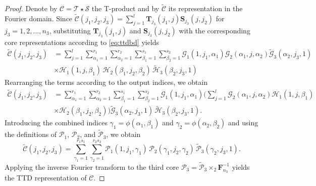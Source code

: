\documentclass[onefignum,onetabnum]{siamart250211}
\begin{document}
\begin{proof}
    Denote by $\mathscr{C}=\mathscr{T}\star\mathscr{S}$  the T-product and by $\widetilde{\mathscr{C}}$  its representation in the Fourier domain. Since $\widetilde{\mathscr{C}}(j_1,j_2,j_3) = \sum_{j=1}^{l}\textbf{T}_{j_3}(j_1,j)\textbf{S}_{j_3}(j,j_2)$ for $j_3=1,2,\dots, n_3$, substituting $\textbf{T}_{j_3}(j_1,j)$ and $\textbf{S}_{j_3}(j,j_2)$ with the corresponding core representations according to \eqref{eq:ttdbd} yields
    \begin{align*}
\widetilde{\mathscr{C}}(j_1,j_2,j_3)&= 
\sum_{j=1}^{l}
\sum_{\alpha_1=1}^{r_1}
\sum_{\alpha_2=1}^{r_2}
\sum_{\beta_1=1}^{s_1}
\sum_{\beta_2=1}^{s_2}
\mathscr{G}_1(1,j_1,\alpha_1)
\mathscr{G}_2(\alpha_1,j,\alpha_2)
\widetilde{\mathscr{G}}_3(\alpha_2,j_3,1)\\
& \times\mathscr{H}_1(1,j,\beta_1)\, \mathscr{H}_2(\beta_1,j_2,\beta_2)\, \widetilde{\mathscr{H}}_3(\beta_2,j_3,1) 
    \end{align*}
Rearranging the terms according to the output indices, we obtain 
\begin{align*}
\widetilde{\mathscr{C}}(j_1,j_2,j_3)
&= 
\sum_{\alpha_1=1}^{r_1}
\sum_{\alpha_2=1}^{r_2}
\sum_{\beta_1=1}^{s_1}
\sum_{\beta_2=1}^{s_2}
\mathscr{G}_1(1,j_1,\alpha_1)
\Bigg(
\sum_{j=1}^{l}
\mathscr{G}_2(\alpha_1,j,\alpha_2)
\mathscr{H}_1(1,j,\beta_1)\\
&\times\mathscr{H}_2(\beta_1,j_2,\beta_2)
\Bigg)
\widetilde{\mathscr{G}}_3(\alpha_2,j_3,1)\,
\widetilde{\mathscr{H}}_3(\beta_2,j_3,1).
\end{align*}
Introducing the combined indices $\gamma_1=\phi(\alpha_1,\beta_1)$ and $\gamma_2=\phi(\alpha_2,\beta_2)$ and using the definitions of $\mathscr{P}_1$, $\mathscr{P}_2$, and $\widetilde{\mathscr{P}}_3$, we obtain
\begin{equation*}
    \widetilde{\mathscr{C}}(j_1,j_2,j_3)
=
\sum_{\gamma_1=1}^{r_1s_1}
\sum_{\gamma_2=1}^{r_2s_2}
\mathscr{P}_1(1,j_1,\gamma_1)\,
\mathscr{P}_2(\gamma_1,j_2,\gamma_2)\,
\widetilde{\mathscr{P}}_3(\gamma_2,j_3,1).
\end{equation*}
Applying the inverse Fourier transform to the third core $\mathscr{P}_3 = \widetilde{\mathscr{P}}_3 \times_2 \textbf{F}_{n_3}^{-1}$ yields the TTD representation of $\mathscr{C}$.
\end{proof}
\end{document}
